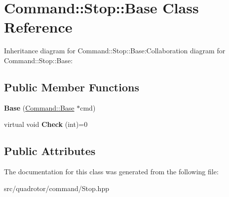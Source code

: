 \hypertarget{classCommand_1_1Stop_1_1Base}{
\section{Command::Stop::Base Class Reference}
\label{classCommand_1_1Stop_1_1Base}
}
Inheritance diagram for Command::Stop::Base:Collaboration diagram for Command::Stop::Base:\subsection*{Public Member Functions}
\begin{DoxyCompactItemize}
\item 
\hypertarget{classCommand_1_1Stop_1_1Base_a5aad1b25a4bef2187a1901c1522b3fc6}{
{\bfseries Base} (\hyperlink{classCommand_1_1Base}{Command::Base} $\ast$cmd)}
\label{classCommand_1_1Stop_1_1Base_a5aad1b25a4bef2187a1901c1522b3fc6}

\item 
\hypertarget{classCommand_1_1Stop_1_1Base_a9b64cdd96ab19d1821d97fc6a4d58071}{
virtual void {\bfseries Check} (int)=0}
\label{classCommand_1_1Stop_1_1Base_a9b64cdd96ab19d1821d97fc6a4d58071}

\end{DoxyCompactItemize}
\subsection*{Public Attributes}


The documentation for this class was generated from the following file:\begin{DoxyCompactItemize}
\item 
src/quadrotor/command/Stop.hpp\end{DoxyCompactItemize}
